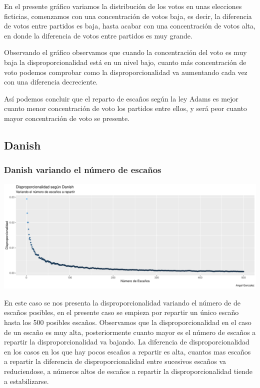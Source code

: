 \documentclass[12pt,a4paper,]{book}
\numberwithin{dummy}{section}
\theoremstyle{ocrenumbox}
\theoremstyle{blacknumex}
\theoremstyle{blacknumbox}
\theoremstyle{ocrenum}
\theoremstyle{ocrenum}
\begin{document}
En el presente gráfico variamos la distribución de los votos en unas
elecciones ficticias, comenzamos con una concentración de votos baja, es
decir, la diferencia de votos entre partidos es baja, hasta acabar con
una concentración de votos alta, en donde la diferencia de votos entre
partidos es muy grande.

Observando el gráfico observamos que cuando la concentración del voto es
muy baja la disproporcionalidad está en un nivel bajo, cuanto más
concentración de voto podemos comprobar como la disproporcionalidad va
aumentando cada vez con una diferencia decreciente.

Así podemos concluir que el reparto de escaños según la ley Adams es
mejor cuanto menor concentración de voto los partidos entre ellos, y
será peor cuanto mayor concentración de voto se presente.

\hypertarget{danish}{%
\subsection{Danish}\label{danish}}

\hypertarget{danish-variando-el-nuxfamero-de-escauxf1os}{%
\subsubsection{Danish variando el número de
escaños}\label{danish-variando-el-nuxfamero-de-escauxf1os}}

\begin{center}\includegraphics[width=0.95\linewidth]{figurasR/unnamed-chunk-39-1} \end{center}

En este caso se nos presenta la disproporcionalidad variando el número
de de escaños posibles, en el presente caso se empieza por repartir un
único escaño hasta los 500 posibles escaños. Observamos que la
disproporcionalidad en el caso de un escaño es muy alta, posteriormente
cuanto mayor es el número de escaños a repartir la disproporcionalidad
va bajando. La diferencia de disproporcionalidad en los casos en los que
hay pocos escaños a repartir es alta, cuantos mas escaños a repartir la
diferencia de disproporcionalidad entre sucesivos escaños va
reduciendose, a números altos de escaños a repartir la
disproporcionalidad tiende a estabilizarse.
\end{document}
